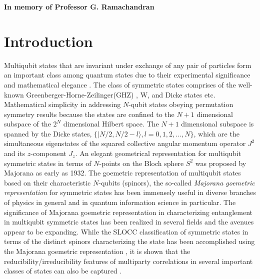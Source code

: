 \begin{center}
\textbf{\Large In memory of Professor G. Ramachandran}
\end{center}

\section{Introduction}\label{chap26-sec1}

Multiqubit states that are invariant under exchange of any pair of particles form an important class among quantum states due to their experimental significance and mathematical elegance \cite{sym1,sym1a,sym1b,sym2,sym3}. The class of symmetric states comprises of the well-known Greenberger-Horne-Zeilinger(GHZ) \cite{ghz}, W, and Dicke states \cite{dicke} etc. Mathematical simplicity in addressing $N$-qubit  states obeying permutation symmetry results because the states are confined to the $N+1$ dimensional subspace of the $2^N$ dimensional Hilbert space. The $N+1$ dimensional subspace is spanned by the Dicke states, $\{\vert N/2, N/2-l\rangle,  l=0,1,2,\ldots,N\}$, which are the simultaneous eigenstates of the squared collective angular momentum operator $J^2$ and its $z$-component $J_z$. An elegant geometrical representation for  multiqubit symmetric states in terms of $N$-points on the Bloch sphere $S^2$ was proposed by Majorana \cite{majorana} as early as 1932. The goemetric representation of multiqubit states based on their characteristic $N$-qubits (spinors), the so-called {\em Majorana goemetric representation} for symmetric states \cite{majorana,1945,makela} has been  immensely useful in diverse branches of physics \cite{1945,jpa4,arxiv4,jpa5,ejtp6} in general and in quantum information science \cite{solano, mixed, usa, usa1,usa2,markham1,markham2,gebastin,markham3} in particular.  The significance of Majorana goemetric representation in characterizing entanglement in multiqubit symmetric states has been realized in several fields and the avenues appear to be expanding. While the SLOCC classification of symmetric states in terms of the distinct spinors characterizing the state has been accomplished using the Majorana goemetric representation \cite{solano, mixed}, it is shown that the reducibility/irreducibility features of multiparty correlations in several important classes of states can also be captured \cite{usa1,usa2,usa}. 

